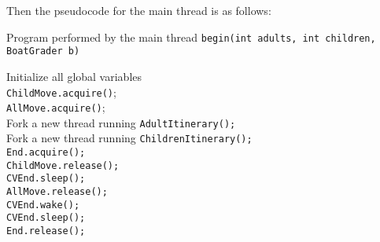 \documentclass{article}
\begin{document}
\begin{spacing}{1.1}
Then the pseudocode for the main thread is as follows:

\begin{algorithm}
  \caption{Program performed by the main thread \texttt{begin(int adults, int children, BoatGrader b)}}
\begin{algorithmic}[1]
  \STATE Initialize all global variables\\
  \STATE \texttt{ChildMove.acquire()}; \\
\STATE \texttt{AllMove.acquire()};\\
\STATE Fork a new thread running \texttt{AdultItinerary();}\\
\ENDFOR
{}
\STATE Fork a new thread running \texttt{ChildrenItinerary();}\\
\ENDFOR
\STATE \texttt{End.acquire();}\\
\STATE \texttt{ChildMove.release();}\\
\STATE \texttt{CVEnd.sleep();}\\
\STATE \texttt{AllMove.release();}\\
\STATE \texttt{CVEnd.wake();}\\
\STATE \texttt{CVEnd.sleep();}\\
\STATE \texttt{End.release();}\\
\RETURN
\end{algorithmic}
\end{algorithm}


\end{spacing}
\end{document}
